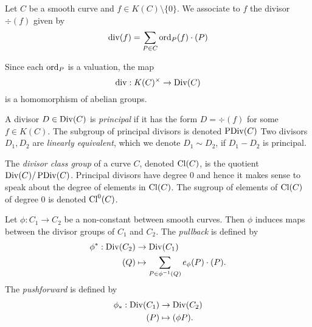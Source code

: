 \begin{definition}
	Let $C$ be a smooth curve and $f \in K(C)\setminus\{0\}$. We
	associate to $f$ the divisor $\div(f)$ given by
	\begin{equation*}
		\operatorname{div}(f) = \sum_{P \in C}\operatorname{ord}_P(f)\cdot(P)
	\end{equation*}
\end{definition}

\begin{remark}
	Since each $\operatorname{ord}_P$ is a valuation, the map
	\begin{equation*}
		\operatorname{div}: K(C)^\times \to \operatorname{Div}(C)
	\end{equation*}
	is a homomorphism of abelian groups.
\end{remark}

\begin{definition}
	A divisor $D \in \operatorname{Div}(C)$ is \emph{principal} if it has the form
	$D = \div(f)$ for some $f \in K(C)$. The subgroup of principal divisors
	is denoted $\operatorname{PDiv}(C)$
	Two divisors $D_1, D_2$ are \emph{linearly equivalent}, which we denote
	$D_1 \sim D_2$, if $D_1 - D_2$ is principal.
\end{definition}

\begin{definition}
	The \emph{divisor class group} of a curve $C$,
	denoted $\operatorname{Cl}(C)$, is the quotient $\operatorname{Div}(C)/\operatorname{PDiv}(C)$.
	Principal divisors have degree $0$ and hence it makes sense to speak about
	the degree of elements in $\operatorname{Cl}(C)$. The sugroup of elements of $\operatorname{Cl}(C)$ of
	degree $0$ is denoted $\operatorname{Cl}^0(C)$.
\end{definition}


\begin{definition}
	Let $\phi: C_1 \to C_2$ be a non-constant between smooth curves.
	Then $\phi$ induces maps between the divisor groups of $C_1$ and $C_2$.
	The \emph{pullback} is defined by
	\begin{align*}
		\phi^*: \operatorname{Div}(C_2) &\to \operatorname{Div}(C_1)\\
		(Q) &\mapsto \sum_{P \in \phi^{-1}(Q)}e_\phi(P)\cdot(P).
	\end{align*}
	The \emph{pushforward} is defined by
	\begin{align*}
		\phi_*: \operatorname{Div}(C_1) &\to \operatorname{Div}(C_2)\\
		(P) &\mapsto (\phi P).
	\end{align*}
\end{definition}

